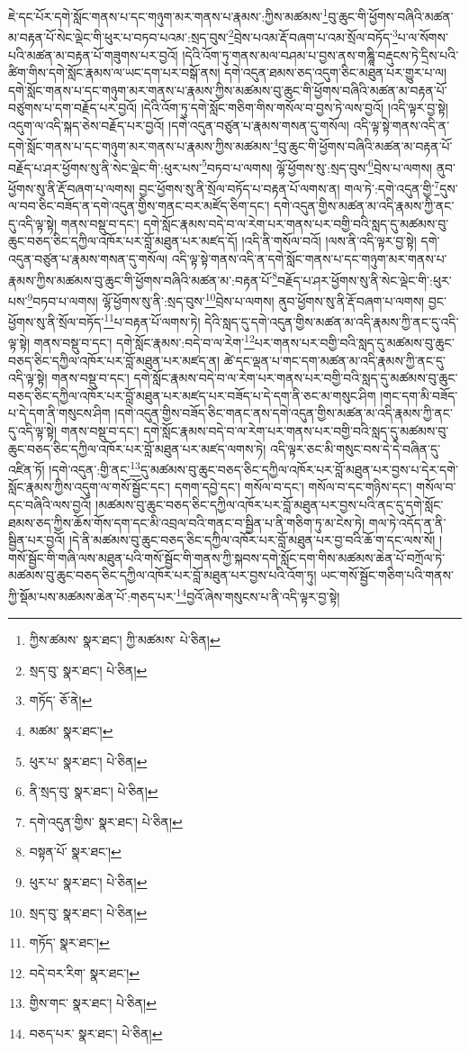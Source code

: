 ཇེ་དང་པོར་དགེ་སློང་གནས་པ་དང་གཉུག་མར་གནས་པ་རྣམས་:ཀྱིས་མཚམས་\footnote{ཀྱིས་ཚམས་  སྣར་ཐང་། ཀྱི་མཚམས་  པེ་ཅིན། }བུ་ཆུང་གི་ཕྱོགས་བཞིའི་མཚན་མ་བརྟན་པོ་སེང་ལྡེང་གི་ཕུར་པ་བཏབ་པའམ་:སྲད་བུས་\footnote{སྲད་བུ་  སྣར་ཐང་།  པེ་ཅིན། }བྲེས་པའམ་རྡོ་བཞག་པ་འམ་སྲོལ་བཏོད་\footnote{གཏོད་  ཅོ་ནེ། }པ་ལ་སོགས་པའི་མཚན་མ་བརྟན་པོ་གཟུགས་པར་བྱའོ། །དེའི་འོག་ཏུ་གནས་མལ་བཤམ་པ་བྱས་ནས་གཎྜཱི་བརྡུངས་ཏེ་དྲིས་པའི་ཚིག་གིས་དགེ་སློང་རྣམས་ལ་ཡང་དག་པར་བསྒོ་ནས། དགེ་འདུན་ཐམས་ཅད་འདུག་ཅིང་མཐུན་པར་གྱུར་པ་ལ། དགེ་སློང་གནས་པ་དང་གཉུག་མར་གནས་པ་རྣམས་ཀྱིས་མཚམས་བུ་ཆུང་གི་ཕྱོགས་བཞིའི་མཚན་མ་བརྟན་པོ་བཙུགས་པ་དག་བརྗོད་པར་བྱའོ། །དེའི་འོག་ཏུ་དགེ་སློང་གཅིག་གིས་གསོལ་བ་བྱས་ཏེ་ལས་བྱའོ། །འདི་ལྟར་བྱ་སྟེ། འདུག་ལ་འདི་སྐད་ཅེས་བརྗོད་པར་བྱའོ། །དགེ་འདུན་བཙུན་པ་རྣམས་གསན་དུ་གསོལ། འདི་ལྟ་སྟེ་གནས་འདི་ན་དགེ་སློང་གནས་པ་དང་གཉུག་མར་གནས་པ་རྣམས་ཀྱིས་མཚམས་\footnote{མཚམ་  སྣར་ཐང་། }བུ་ཆུང་གི་ཕྱོགས་བཞིའི་མཚན་མ་བརྟན་པོ་བརྗོད་པ་ཤར་ཕྱོགས་སུ་ནི་སེང་ལྡེང་གི་:ཕུར་པས་\footnote{ཕུར་པ་  སྣར་ཐང་།  པེ་ཅིན། }བཏབ་པ་ལགས། ལྷོ་ཕྱོགས་སུ་:སྲད་བུས་\footnote{ནི་སྲད་བུ་  སྣར་ཐང་།  པེ་ཅིན། }བྲེས་པ་ལགས། ནུབ་ཕྱོགས་སུ་ནི་རྡོ་བཞག་པ་ལགས། བྱང་ཕྱོགས་སུ་ནི་སྲོལ་བཏོད་པ་བརྟན་པོ་ལགས་ན། གལ་ཏེ་:དགེ་འདུན་གྱི་\footnote{དགེ་འདུན་གྱིས་  སྣར་ཐང་།  པེ་ཅིན། }དུས་ལ་བབ་ཅིང་བཟོད་ན་དགེ་འདུན་གྱིས་གནང་བར་མཛོད་ཅིག་དང་། དགེ་འདུན་གྱིས་མཚན་མ་འདི་རྣམས་ཀྱི་ནང་དུ་འདི་ལྟ་སྟེ། གནས་བསྡུ་བ་དང་། དགེ་སློང་རྣམས་བདེ་བ་ལ་རེག་པར་གནས་པར་བགྱི་བའི་སླད་དུ་མཚམས་བུ་ཆུང་བཅད་ཅིང་དཀྱིལ་འཁོར་པར་བློ་མཐུན་པར་མཛད་དོ། །འདི་ནི་གསོལ་བའོ། །ལས་ནི་འདི་ལྟར་བྱ་སྟེ། དགེ་འདུན་བཙུན་པ་རྣམས་གསན་དུ་གསོལ། འདི་ལྟ་སྟེ་གནས་འདི་ན་དགེ་སློང་གནས་པ་དང་གཉུག་མར་གནས་པ་རྣམས་ཀྱིས་མཚམས་བུ་ཆུང་གི་ཕྱོགས་བཞིའི་མཚན་མ་:བརྟན་པོ་\footnote{བསྟན་པོ་  སྣར་ཐང་། }བརྗོད་པ་ཤར་ཕྱོགས་སུ་ནི་སེང་ལྡེང་གི་:ཕུར་པས་\footnote{ཕུར་པ་  སྣར་ཐང་།  པེ་ཅིན། }བཏབ་པ་ལགས། ལྷོ་ཕྱོགས་སུ་ནི་:སྲད་བུས་\footnote{སྲད་བུ་  སྣར་ཐང་།  པེ་ཅིན། }བྲེས་པ་ལགས། ནུབ་ཕྱོགས་སུ་ནི་རྡོ་བཞག་པ་ལགས། བྱང་ཕྱོགས་སུ་ནི་སྲོལ་བཏོད་\footnote{གཏོད་  སྣར་ཐང་། }པ་བརྟན་པོ་ལགས་ཏེ། དེའི་སླད་དུ་དགེ་འདུན་གྱིས་མཚན་མ་འདི་རྣམས་ཀྱི་ནང་དུ་འདི་ལྟ་སྟེ། གནས་བསྡུ་བ་དང་། དགེ་སློང་རྣམས་:བདེ་བ་ལ་རེག་\footnote{བདེ་བར་རིག་  སྣར་ཐང་། }པར་གནས་པར་བགྱི་བའི་སླད་དུ་མཚམས་བུ་ཆུང་བཅད་ཅིང་དཀྱིལ་འཁོར་པར་བློ་མཐུན་པར་མཛད་ན། ཚེ་དང་ལྡན་པ་གང་དག་མཚན་མ་འདི་རྣམས་ཀྱི་ནང་དུ་འདི་ལྟ་སྟེ། གནས་བསྡུ་བ་དང་། དགེ་སློང་རྣམས་བདེ་བ་ལ་རེག་པར་གནས་པར་བགྱི་བའི་སླད་དུ་མཚམས་བུ་ཆུང་བཅད་ཅིང་དཀྱིལ་འཁོར་པར་བློ་མཐུན་པར་མཛད་པར་བཟོད་པ་དེ་དག་ནི་ཅང་མ་གསུང་ཤིག །གང་དག་མི་བཟོད་པ་དེ་དག་ནི་གསུངས་ཤིག །དགེ་འདུན་གྱིས་བཟོད་ཅིང་གནང་ནས་དགེ་འདུན་གྱིས་མཚན་མ་འདི་རྣམས་ཀྱི་ནང་དུ་འདི་ལྟ་སྟེ། གནས་བསྡུ་བ་དང་། དགེ་སློང་རྣམས་བདེ་བ་ལ་རེག་པར་གནས་པར་བགྱི་བའི་སླད་དུ་མཚམས་བུ་ཆུང་བཅད་ཅིང་དཀྱིལ་འཁོར་པར་བློ་མཐུན་པར་མཛད་ལགས་ཏེ། འདི་ལྟར་ཅང་མི་གསུང་བས་དེ་དེ་བཞིན་དུ་འཛིན་ཏོ། །དགེ་འདུན་:གྱི་ནང་\footnote{གྱིས་གང་  སྣར་ཐང་།  པེ་ཅིན། }དུ་མཚམས་བུ་ཆུང་བཅད་ཅིང་དཀྱིལ་འཁོར་པར་བློ་མཐུན་པར་བྱས་པ་དེར་དགེ་སློང་རྣམས་ཀྱིས་འདུག་ལ་གསོ་སྦྱོང་དང་། དགག་དབྱེ་དང་། གསོལ་བ་དང་། གསོལ་བ་དང་གཉིས་དང་། གསོལ་བ་དང་བཞིའི་ལས་བྱའོ། །མཚམས་བུ་ཆུང་བཅད་ཅིང་དཀྱིལ་འཁོར་པར་བློ་མཐུན་པར་བྱས་པའི་ནང་དུ་དགེ་སློང་ཐམས་ཅད་ཀྱིས་ཆོས་གོས་དག་དང་མི་འབྲལ་བའི་གནང་བ་སྦྱིན་པ་ནི་གཅིག་ཏུ་མ་ངེས་ཏེ། གལ་ཏེ་འདོད་ན་ནི་སྦྱིན་པར་བྱའོ། །དེ་ནི་མཚམས་བུ་ཆུང་བཅད་ཅིང་དཀྱིལ་འཁོར་པར་བློ་མཐུན་པར་བྱ་བའི་ཆོ་ག་དང་ལས་སོ། །གསོ་སྦྱོང་གི་གཞི་ལས་མཐུན་པའི་གསོ་སྦྱོང་གི་གནས་ཀྱི་སྐབས་དགེ་སློང་དག་གིས་མཚམས་ཆེན་པོ་བཀྲོལ་ཏེ་མཚམས་བུ་ཆུང་བཅད་ཅིང་དཀྱིལ་འཁོར་པར་བློ་མཐུན་པར་བྱས་པའི་འོག་ཏུ། ཡང་གསོ་སྦྱོང་གཅིག་པའི་གནས་ཀྱི་སྡོམ་པས་མཚམས་ཆེན་པོ་:གཅད་པར་\footnote{བཅད་པར་  སྣར་ཐང་།  པེ་ཅིན། }བྱའོ་ཞེས་གསུངས་པ་ནི་འདི་ལྟར་བྱ་སྟེ། 